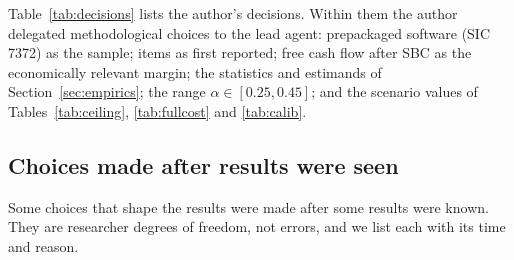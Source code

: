 \noindent Table~\ref{tab:decisions} lists the author's decisions. Within them the author delegated methodological choices to the lead agent: prepackaged software (SIC 7372) as the sample; items as first reported; free cash flow after SBC as the economically relevant margin; the statistics and estimands of Section~\ref{sec:empirics}; the range $\alpha\in[0.25,0.45]$; and the scenario values of Tables~\ref{tab:ceiling}, \ref{tab:fullcost} and \ref{tab:calib}.

\subsection{Choices made after results were seen}\label{app:protocol-choices}
Some choices that shape the results were made after some results were known. They are researcher degrees of freedom, not errors, and we list each with its time and reason.
